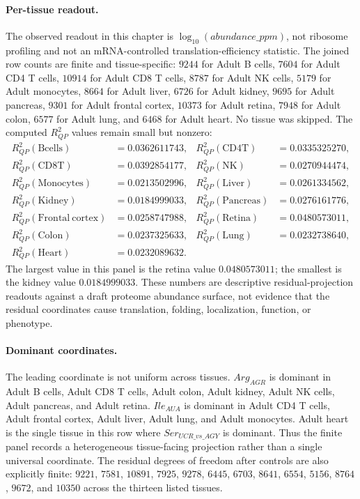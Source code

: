\paragraph{Per-tissue readout.}
The observed readout in this chapter is $\log_{10}(abundance\_ppm)$, not ribosome profiling and not an mRNA-controlled translation-efficiency statistic.  The joined row counts are finite and tissue-specific: $9244$ for Adult B cells, $7604$ for Adult CD4 T cells, $10914$ for Adult CD8 T cells, $8787$ for Adult NK cells, $5179$ for Adult monocytes, $8664$ for Adult liver, $6726$ for Adult kidney, $9695$ for Adult pancreas, $9301$ for Adult frontal cortex, $10373$ for Adult retina, $7948$ for Adult colon, $6577$ for Adult lung, and $6468$ for Adult heart.  No tissue was skipped.  The computed $R^2_{QP}$ values remain small but nonzero:
$$
\begin{aligned}
R^2_{QP}(\mathrm{Bcells}) &= 0.0362611743, & R^2_{QP}(\mathrm{CD4T}) &= 0.0335325270,\\
R^2_{QP}(\mathrm{CD8T}) &= 0.0392854177, & R^2_{QP}(\mathrm{NK}) &= 0.0270944474,\\
R^2_{QP}(\mathrm{Monocytes}) &= 0.0213502996, & R^2_{QP}(\mathrm{Liver}) &= 0.0261334562,\\
R^2_{QP}(\mathrm{Kidney}) &= 0.0184999033, & R^2_{QP}(\mathrm{Pancreas}) &= 0.0276161776,\\
R^2_{QP}(\mathrm{Frontal\ cortex}) &= 0.0258747988, & R^2_{QP}(\mathrm{Retina}) &= 0.0480573011,\\
R^2_{QP}(\mathrm{Colon}) &= 0.0237325633, & R^2_{QP}(\mathrm{Lung}) &= 0.0232738640,\\
R^2_{QP}(\mathrm{Heart}) &= 0.0232089632. & &
\end{aligned}
$$
The largest value in this panel is the retina value $0.0480573011$; the smallest is the kidney value $0.0184999033$.  These numbers are descriptive residual-projection readouts against a draft proteome abundance surface, not evidence that the residual coordinates cause translation, folding, localization, function, or phenotype.

\paragraph{Dominant coordinates.}
The leading coordinate is not uniform across tissues.  $Arg_{AGR}$ is dominant in Adult B cells, Adult CD8 T cells, Adult colon, Adult kidney, Adult NK cells, Adult pancreas, and Adult retina.  $Ile_{AUA}$ is dominant in Adult CD4 T cells, Adult frontal cortex, Adult liver, Adult lung, and Adult monocytes.  Adult heart is the single tissue in this row where $Ser_{UCR\_vs\_AGY}$ is dominant.  Thus the finite panel records a heterogeneous tissue-facing projection rather than a single universal coordinate.  The residual degrees of freedom after controls are also explicitly finite: $9221$, $7581$, $10891$, $7925$, $9278$, $6445$, $6703$, $8641$, $6554$, $5156$, $8764$, $9672$, and $10350$ across the thirteen listed tissues.

